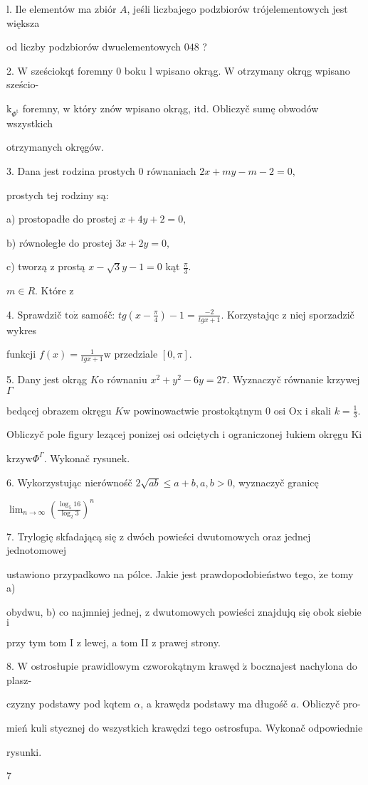 \documentclass[a4paper,12pt]{article}
\begin{document}
l. Ile elementów ma zbiór $A$, jeśli liczbajego podzbiorów trójelementowych jest większa

od liczby podzbiorów dwuelementowych $048$ ?

2. $\mathrm{W}$ sześciokqt foremny $0$ boku l wpisano okrąg. $\mathrm{W}$ otrzymany okrqg wpisano sześcio-

$\mathrm{k}_{\Phi^{\mathrm{t}}}$ foremny, $\mathrm{w}$ który znów wpisano okrąg, itd. Obliczyč sumę obwodów wszystkich

otrzymanych okręgów.

3. Dana jest rodzina prostych $0$ równaniach $2x+my-m-2=0,$

prostych tej rodziny są:

a) prostopadłe do prostej $x+4y+2=0,$

b) równoległe do prostej $3x+2y=0,$

c) tworzą $\mathrm{z}$ prostą $x-\sqrt{3}y-1=0$ kąt $\displaystyle \frac{\pi}{3}.$

$m\in R$. Które $\mathrm{z}$

4. Sprawdzič $\mathrm{t}\mathrm{o}\dot{\mathrm{z}}$ samośč: $tg(x-\displaystyle \frac{\pi}{4})-1=\frac{-2}{tgx+1}$. Korzystajqc $\mathrm{z}$ niej sporzadzič wykres

funkcji $f(x)=\displaystyle \frac{1}{tgx+1}\mathrm{w}$ przedziale $[0,\pi].$

5. Dany jest okrąg $K\mathrm{o}$ równaniu $x^{2}+y^{2}-6y=27$. Wyznaczyč równanie krzywej $\Gamma$

bedącej obrazem okręgu $K\mathrm{w}$ powinowactwie prostokątnym $0$ osi Ox $\mathrm{i}$ skali $k=\displaystyle \frac{1}{3}.$

Obliczyč pole figury lezącej ponizej osi odciętych $\mathrm{i}$ ograniczonej łukiem okręgu $\mathrm{K}\mathrm{i}$

$\mathrm{k}\mathrm{r}\mathrm{z}\mathrm{y}\mathrm{w}\Phi^{\Gamma}$. Wykonač rysunek.

6. Wykorzystując nierównośč $2\sqrt{ab}\leq a+b, a, b>0$, wyznaczyč granicę

$\displaystyle \lim_{n\rightarrow\infty}(\frac{\log_{5}16}{\log_{2}3})^{n}$

7. Trylogię skfadającą się $\mathrm{z}$ dwóch powieści dwutomowych oraz jednej jednotomowej

ustawiono przypadkowo na pólce. Jakie jest prawdopodobieństwo tego, $\dot{\mathrm{z}}\mathrm{e}$ tomy a)

obydwu, b) co najmniej jednej, $\mathrm{z}$ dwutomowych powieści znajdujq się obok siebie $\mathrm{i}$

przy tym tom I $\mathrm{z}$ lewej, a tom II $\mathrm{z}$ prawej strony.

8. $\mathrm{W}$ ostrosłupie prawidlowym czworokątnym krawęd $\acute{\mathrm{z}}$ bocznajest nachylona do plasz-

czyzny podstawy pod kqtem $\alpha$, a krawędz$\acute{}$ podstawy ma długośč $a$. Obliczyč pro-

mień kuli stycznej do wszystkich krawędzi tego ostrosfupa. Wykonač odpowiednie

rysunki.

7
\end{document}
